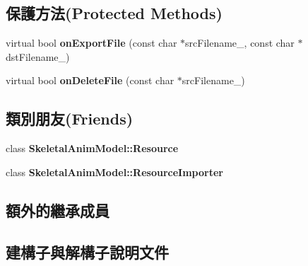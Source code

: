 \subsection*{保護方法(Protected Methods)}
\begin{DoxyCompactItemize}
\item 
virtual bool {\bfseries on\+Export\+File} (const char $\ast$src\+Filename\+\_\+, const char $\ast$dst\+Filename\+\_\+)\hypertarget{class_magnum_1_1endif_1_1_resource_importer_a4a9da28160008fbc6c6ea7abedb19b2a}{}\label{class_magnum_1_1endif_1_1_resource_importer_a4a9da28160008fbc6c6ea7abedb19b2a}

\item 
virtual bool {\bfseries on\+Delete\+File} (const char $\ast$src\+Filename\+\_\+)\hypertarget{class_magnum_1_1endif_1_1_resource_importer_a7f6fd2839c4e83122610381493ac47e4}{}\label{class_magnum_1_1endif_1_1_resource_importer_a7f6fd2839c4e83122610381493ac47e4}

\end{DoxyCompactItemize}
\subsection*{類別朋友(Friends)}
\begin{DoxyCompactItemize}
\item 
class {\bfseries Skeletal\+Anim\+Model\+::\+Resource}\hypertarget{class_magnum_1_1endif_1_1_resource_importer_aa42d6fae22974f056f499a1801b312ad}{}\label{class_magnum_1_1endif_1_1_resource_importer_aa42d6fae22974f056f499a1801b312ad}

\item 
class {\bfseries Skeletal\+Anim\+Model\+::\+Resource\+Importer}\hypertarget{class_magnum_1_1endif_1_1_resource_importer_abe6e9c8335bb9bb2fc5db9830a151ce4}{}\label{class_magnum_1_1endif_1_1_resource_importer_abe6e9c8335bb9bb2fc5db9830a151ce4}

\end{DoxyCompactItemize}
\subsection*{額外的繼承成員}


\subsection{建構子與解構子說明文件}
